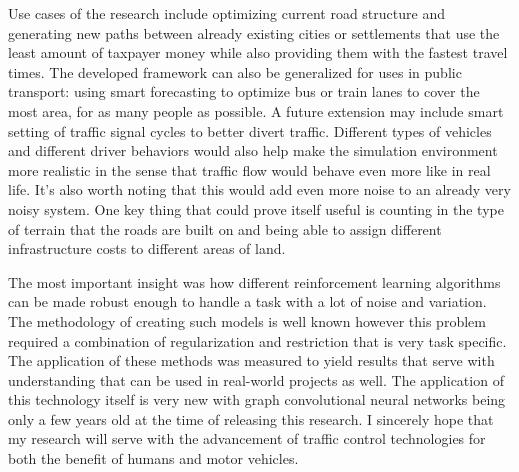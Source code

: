 \documentclass[
]{elteikthesis}[2023/04/10]
\begin{document}
Use cases of the research include optimizing current road structure
and generating new paths between already existing cities or settlements
that use the least amount of taxpayer money while also providing them
with the fastest travel times. The developed framework can also be
generalized for uses in public transport: using smart forecasting
to optimize bus or train lanes to cover the most area, for as many
people as possible. A future extension may include smart setting of
traffic signal cycles to better divert traffic. Different types of
vehicles and different driver behaviors would also help make the simulation
environment more realistic in the sense that traffic flow would behave
even more like in real life. It's also worth noting that this would
add even more noise to an already very noisy system. One key thing
that could prove itself useful is counting in the type of terrain
that the roads are built on and being able to assign different infrastructure
costs to different areas of land.

The most important insight was how different reinforcement learning
algorithms can be made robust enough to handle a task with a lot of
noise and variation. The methodology of creating such models is well
known however this problem required a combination of regularization
and restriction that is very task specific. The application of these
methods was measured to yield results that serve with understanding
that can be used in real-world projects as well. The application of
this technology itself is very new with graph convolutional neural
networks being only a few years old at the time of releasing this
research. I sincerely hope that my research will serve with the advancement
of traffic control technologies for both the benefit of humans and
motor vehicles.

\newpage{}


\listoffigures

\listoftables
\end{document}
